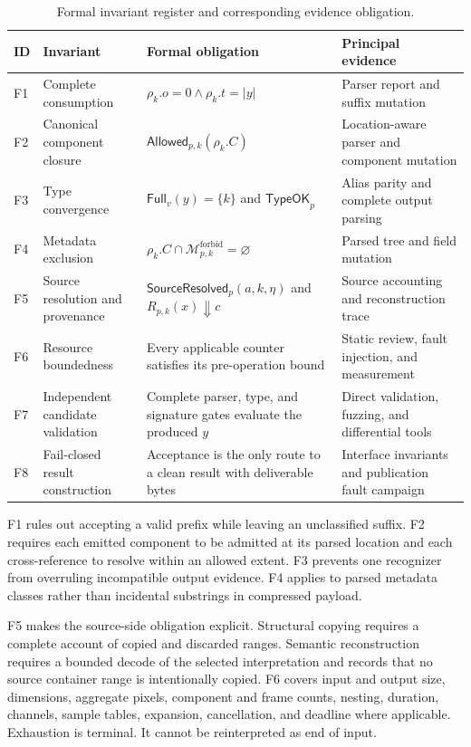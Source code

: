 \begin{table}[t]
\centering
\caption{Formal invariant register and corresponding evidence obligation.}
\label{tab:properties-p1-p8}
\small
\begin{tabularx}{\textwidth}{L{0.07\textwidth}L{0.25\textwidth}YL{0.22\textwidth}}
\toprule
ID & Invariant & Formal obligation & Principal evidence \\
\midrule
F1 & Complete consumption & $\rho_k.o=0\land\rho_k.t=|y|$ & Parser report and suffix mutation \\
F2 & Canonical component closure & $\mathsf{Allowed}_{p,k}(\rho_k.C)$ & Location-aware parser and component mutation \\
F3 & Type convergence & $\mathsf{Full}_{v}(y)=\{k\}$ and $\mathsf{TypeOK}_{p}$ & Alias parity and complete output parsing \\
F4 & Metadata exclusion & $\rho_k.C\cap\mathcal{M}^{\mathrm{forbid}}_{p,k}=\varnothing$ & Parsed tree and field mutation \\
F5 & Source resolution and provenance & $\mathsf{SourceResolved}_{p}(a,k,\eta)$ and $R_{p,k}(x)\Downarrow c$ & Source accounting and reconstruction trace \\
F6 & Resource boundedness & Every applicable counter satisfies its pre-operation bound & Static review, fault injection, and measurement \\
F7 & Independent candidate validation & Complete parser, type, and signature gates evaluate the produced $y$ & Direct validation, fuzzing, and differential tools \\
F8 & Fail-closed result construction & Acceptance is the only route to a clean result with deliverable bytes & Interface invariants and publication fault campaign \\
\bottomrule
\end{tabularx}
\end{table}

F1 rules out accepting a valid prefix while leaving an unclassified suffix. F2
requires each emitted component to be admitted at its parsed location and each
cross-reference to resolve within an allowed extent. F3 prevents one recognizer
from overruling incompatible output evidence. F4 applies to parsed metadata
classes rather than incidental substrings in compressed payload.

F5 makes the source-side obligation explicit. Structural copying requires a
complete account of copied and discarded ranges. Semantic reconstruction
requires a bounded decode of the selected interpretation and records that no
source container range is intentionally copied. F6 covers input and output
size, dimensions, aggregate pixels, component and frame counts, nesting,
duration, channels, sample tables, expansion, cancellation, and deadline where
applicable. Exhaustion is terminal. It cannot be reinterpreted as end of input.

